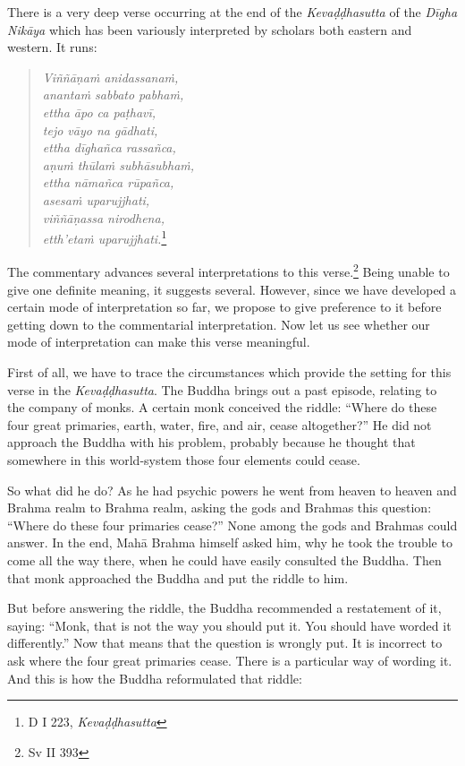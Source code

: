 There is a very deep verse occurring at the end of the \emph{Kevaḍḍhasutta} of the \emph{Dīgha Nikāya} which has been variously interpreted by scholars both eastern and western. It runs:

\begin{quote}
\emph{Viññāṇaṁ anidassanaṁ,}\\
\emph{anantaṁ sabbato pabhaṁ,}\\
\emph{ettha āpo ca paṭhavī,}\\
\emph{tejo vāyo na gādhati,}\\
\emph{ettha dīghañca rassañca,}\\
\emph{aṇuṁ thūlaṁ subhāsubhaṁ,}\\
\emph{ettha nāmañca rūpañca,}\\
\emph{asesaṁ uparujjhati,}\\
\emph{viññāṇassa nirodhena,}\\
\emph{etth'etaṁ uparujjhati.}\footnote{D I 223, \emph{Kevaḍḍhasutta}}
\end{quote}

The commentary advances several interpretations to this verse.\footnote{Sv II 393} Being unable to give one definite meaning, it suggests several. However, since we have developed a certain mode of interpretation so far, we propose to give preference to it before getting down to the commentarial interpretation. Now let us see whether our mode of interpretation can make this verse meaningful.

First of all, we have to trace the circumstances which provide the setting for this verse in the \emph{Kevaḍḍhasutta}. The Buddha brings out a past episode, relating to the company of monks. A certain monk conceived the riddle: ``Where do these four great primaries, earth, water, fire, and air, cease altogether?'' He did not approach the Buddha with his problem, probably because he thought that somewhere in this world-system those four elements could cease.

So what did he do? As he had psychic powers he went from heaven to heaven and Brahma realm to Brahma realm, asking the gods and Brahmas this question: ``Where do these four primaries cease?'' None among the gods and Brahmas could answer. In the end, Mahā Brahma himself asked him, why he took the trouble to come all the way there, when he could have easily consulted the Buddha. Then that monk approached the Buddha and put the riddle to him.

But before answering the riddle, the Buddha recommended a restatement of it, saying: ``Monk, that is not the way you should put it. You should have worded it differently.'' Now that means that the question is wrongly put. It is incorrect to ask where the four great primaries cease. There is a particular way of wording it. And this is how the Buddha reformulated that riddle:

